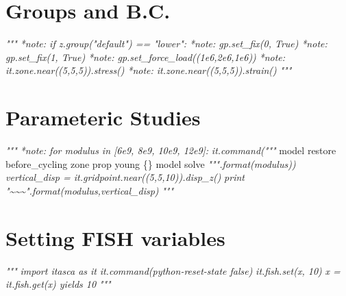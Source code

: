 \documentclass[a4paper, nobind]{templates/ociamthesis}
\newenvironment{Shaded}{\begin{snugshade}}{\end{snugshade}}
\newcommand{\CommentTok}[1]{\textcolor[rgb]{0.56,0.35,0.01}{\textit{#1}}}
\newcommand{\NormalTok}[1]{#1}
\newcommand{\StringTok}[1]{\textcolor[rgb]{0.31,0.60,0.02}{#1}}
\renewenvironment{Shaded}
{
  \vspace{10pt}%
  \begin{snugshade}%
}{%
  \end{snugshade}%
  \vspace{8pt}%
}
\begin{document}
\hypertarget{groups-and-b.c.}{%
\section{Groups and B.C.}\label{groups-and-b.c.}}

\begin{Shaded}
\begin{Highlighting}[]
\CommentTok{"""}
\CommentTok{*note: if z.group("default") == "lower":}
\CommentTok{*note: gp.set\_fix(0, True)}
\CommentTok{*note: gp.set\_fix(1, True)}
\CommentTok{*note: gp.set\_force\_load((1e6,2e6,1e6))}
\CommentTok{*note: it.zone.near((5,5,5)).stress()}
\CommentTok{*note: it.zone.near((5,5,5)).strain()}
\CommentTok{"""}
\end{Highlighting}
\end{Shaded}

\hypertarget{parameteric-studies}{%
\section{Parameteric Studies}\label{parameteric-studies}}

\begin{Shaded}
\begin{Highlighting}[]
\CommentTok{"""}
\CommentTok{*note: for modulus in [6e9, 8e9, 10e9, 12e9]:}
\CommentTok{it.command("""}
\NormalTok{model restore }\StringTok{\textquotesingle{}before\_cycling\textquotesingle{}}
\NormalTok{zone prop young \{\}}
\NormalTok{model solve}
\CommentTok{""".format(modulus))}
\CommentTok{vertical\_disp = it.gridpoint.near((5,5,10)).disp\_z()}
\CommentTok{print "\textasciitilde{}\textasciitilde{}\textasciitilde{}".format(modulus,vertical\_disp)}
\CommentTok{"""}
\end{Highlighting}
\end{Shaded}

\hypertarget{setting-fish-variables}{%
\section{Setting FISH variables}\label{setting-fish-variables}}

\begin{Shaded}
\begin{Highlighting}[]
\CommentTok{"""}
\CommentTok{import itasca as it}
\CommentTok{it.command(\textquotesingle{}python{-}reset{-}state false\textquotesingle{})}
\CommentTok{it.fish.set(\textquotesingle{}x\textquotesingle{}, 10)}
\CommentTok{x = it.fish.get(\textquotesingle{}x\textquotesingle{}) yields 10}
\CommentTok{"""}
\end{Highlighting}
\end{Shaded}
\end{document}
